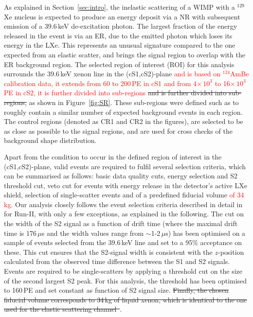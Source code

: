 As explained in Section~\ref{sec:intro}, the inelastic scattering of a WIMP with a $^{129}$Xe nucleus is expected to produce an energy deposit via a NR with subsequent emission of  
a 39.6\,keV de-excitation photon. The largest fraction of the energy released in the event is via an ER, due to the emitted photon which loses its energy in the LXe.
This represents an unusual signature compared to the one expected from an elastic scatter, and brings the signal region to overlap with the ER background region.
The selected region of interest (ROI) for this analysis surrounds the 39.6\,keV xenon line in the (cS1,cS2)-plane 
\textcolor{red} {and is based on $^{124}$AmBe calibration data, it extends from 60 to 200\,PE in cS1 and from 4$\times \, 10^3$ to 16$\times \, 10^3$\,PE in cS2, it is further divided  into sub-regions}
\sout{and is further divided into sub-regions,} as shown 
in Figure~\ref{fig:SR}.  These sub-regions were defined such as to roughly contain a similar number of expected background events in each region. The control regions (denoted as CR1 and CR2 in the figures), are selected to be as close as possible to the signal regions,  and are used for cross checks of the background shape distribution.

Apart from the condition to occur in the defined region of interest in the (cS1,cS2)-plane, valid events are required to fulfil several selection criteria, 
which can be summarised as follows: basic data quality cuts, energy selection and S2 threshold cut, veto cut for events with energy release in the detector's active LXe shield, 
selection of single-scatter events and of a predefined fiducial volume 
\textcolor{red}{of 34\,kg}.  
Our analysis closely follows the event selection criteria described in detail in \cite{Aprile:2012vw} for Run-II, with only a few exceptions, as explained in the following. 
The cut on the width of the S2 signal as a function of drift time (where the maximal drift time is 176\,$\mu$s and the width values range from $\sim$1-2\,$\mu$s) has been optimised on a sample of events selected from the 39.6\,keV line and set to a 95\% acceptance on these. This cut ensures that the S2-signal width is consistent with the $z$-position calculated from the observed time difference between the S1 and S2 signals. Events are required to be single-scatters by applying a threshold cut on the size of the 
second largest S2 peak. For this analysis, the threshold has been optimised to 160\,PE and set constant as function of S2 signal size. 
\sout{Finally, the chosen fiducial volume corresponds to 34\,kg of liquid xenon, which is identical to the one used for the elastic scattering channel~\cite{Aprile:2012vw}}. 






